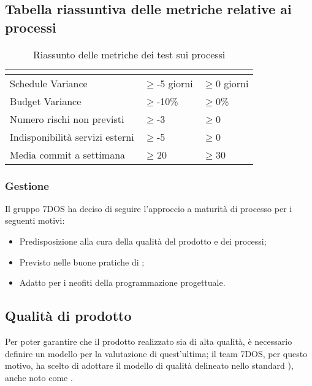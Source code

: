 \subsection{Tabella riassuntiva delle metriche relative ai processi}
\renewcommand{\arraystretch}{1.5}
\begin{table}[H]
	\centering
	\begin{tabular}{|C{5cm}|C{4cm}|C{4cm}|}
		\hline
		\textbf{\color{title_text}{Nome Metrica}} &  \textbf{\color{title_text}{Range accettabile}} & \textbf{\color{title_text}{Range ottimale}} \\ \hline
		Schedule Variance & $\geq$-5 giorni  & $\geq$0 giorni \\ \hline
		Budget Variance&$\geq$-10\% &$\geq$0\% \\ \hline
		Numero rischi non previsti&$\geq$-3 &$\geq$0 \\ \hline
		Indisponibilità servizi esterni&$\geq$-5 &$\geq$0 \\ \hline
		Media commit a settimana&$\geq$20 &$\geq$30 \\ \hline

	\end{tabular}
	\caption{Riassunto delle metriche dei test sui processi}
	\label{tabella:riassunto metriche dei test sui processi}
\end{table}
\renewcommand{\arraystretch}{1}

\subsubsection{Gestione}
	Il gruppo 7DOS ha deciso di seguire l'approccio a maturità di processo per i seguenti motivi:
	\begin{itemize}
	\item Predisposizione alla cura della qualità del prodotto e dei processi;
	\item Previsto nelle buone pratiche di ;
	\item Adatto per i neofiti della programmazione progettuale.
	\end{itemize}
	
\subsection{Qualità di prodotto}
Per poter garantire che il prodotto realizzato sia di alta qualità, è necessario definire un modello per la valutazione di quest'ultima; il team 7DOS, per questo motivo, ha scelto di adottare il modello di qualità delineato nello standard ), anche noto come .

